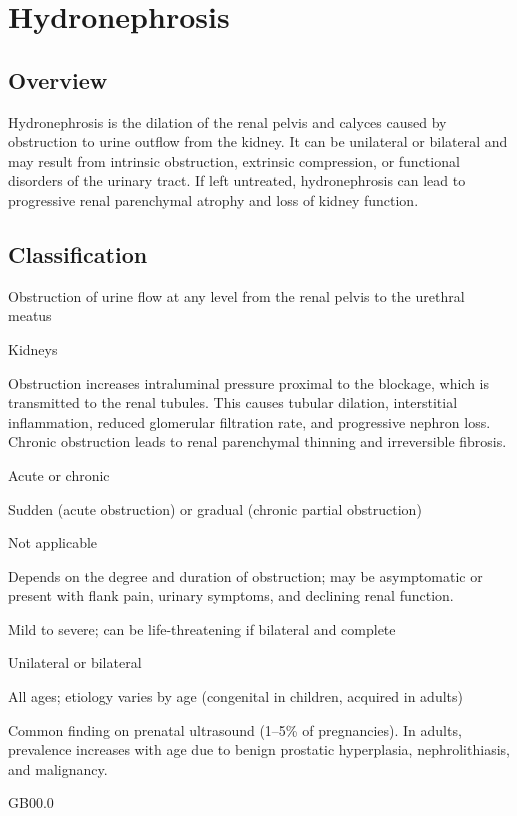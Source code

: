 \chapter{Hydronephrosis}
\label{sec:Hydronephrosis}

\section{Overview}
Hydronephrosis is the dilation of the renal pelvis and calyces caused by obstruction to urine outflow from the kidney. It can be unilateral or bilateral and may result from intrinsic obstruction, extrinsic compression, or functional disorders of the urinary tract. If left untreated, hydronephrosis can lead to progressive renal parenchymal atrophy and loss of kidney function.

\section{Classification}
\begin{description}[font=\normalfont\bfseries,leftmargin=3em,labelwidth=2.5em]
  \item[Cause] Obstruction of urine flow at any level from the renal pelvis to the urethral meatus
  \item[Organ System] Kidneys
  \item[Pathophysiology] Obstruction increases intraluminal pressure proximal to the blockage, which is transmitted to the renal tubules. This causes tubular dilation, interstitial inflammation, reduced glomerular filtration rate, and progressive nephron loss. Chronic obstruction leads to renal parenchymal thinning and irreversible fibrosis.
  \item[Duration] Acute or chronic
  \item[Onset] Sudden (acute obstruction) or gradual (chronic partial obstruction)
  \item[Mode of Transmission] Not applicable
  \item[Clinical Course] Depends on the degree and duration of obstruction; may be asymptomatic or present with flank pain, urinary symptoms, and declining renal function.
  \item[Severity] Mild to severe; can be life-threatening if bilateral and complete
  \item[Extent of Disease] Unilateral or bilateral
  \item[Age Group] All ages; etiology varies by age (congenital in children, acquired in adults)
  \item[Epidemiology] Common finding on prenatal ultrasound (1--5\% of pregnancies). In adults, prevalence increases with age due to benign prostatic hyperplasia, nephrolithiasis, and malignancy.
  \item[ICD-11 Code] GB00.0
\end{description}

